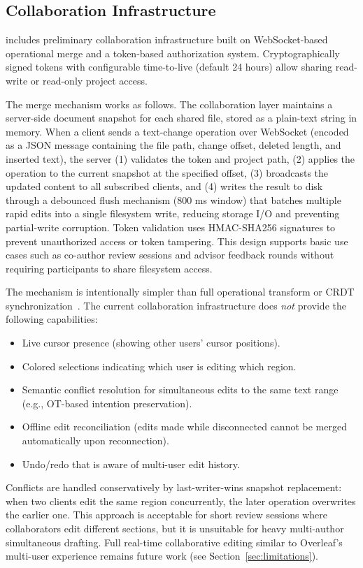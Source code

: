\subsection{Collaboration Infrastructure}

\software{} includes preliminary collaboration infrastructure built on
WebSocket-based operational merge and a token-based authorization system.
Cryptographically signed tokens with configurable time-to-live (default 24
hours) allow sharing read-write or read-only project access.

The merge mechanism works as follows. The collaboration layer maintains a
server-side document snapshot for each shared file, stored as a plain-text
string in memory. When a client sends a text-change operation over WebSocket
(encoded as a JSON message containing the file path, change offset, deleted
length, and inserted text), the server (1) validates the token and project
path, (2) applies the operation to the current snapshot at the specified
offset, (3) broadcasts the updated content to all subscribed clients, and (4)
writes the result to disk through a debounced flush mechanism (800 ms window)
that batches multiple rapid edits into a single filesystem write, reducing
storage I/O and preventing partial-write corruption. Token validation uses
HMAC-SHA256 signatures to prevent unauthorized access or token tampering.
This design supports basic use cases such as co-author review sessions and
advisor feedback rounds without requiring participants to share filesystem
access.

The mechanism is intentionally simpler than full operational transform or CRDT
synchronization~\cite{crdt2011}. The current collaboration infrastructure does
\emph{not} provide the following capabilities:
\begin{itemize}
  \item Live cursor presence (showing other users' cursor positions).
  \item Colored selections indicating which user is editing which region.
  \item Semantic conflict resolution for simultaneous edits to the same text
  range (e.g., OT-based intention preservation).
  \item Offline edit reconciliation (edits made while disconnected cannot be
  merged automatically upon reconnection).
  \item Undo/redo that is aware of multi-user edit history.
\end{itemize}
\noindent Conflicts are handled conservatively by last-writer-wins snapshot
replacement: when two clients edit the same region concurrently, the later
operation overwrites the earlier one. This approach is acceptable for
short review sessions where collaborators edit different sections, but it is
unsuitable for heavy multi-author simultaneous drafting. Full real-time
collaborative editing similar to Overleaf's multi-user experience remains
future work (see Section~\ref{sec:limitations}).

